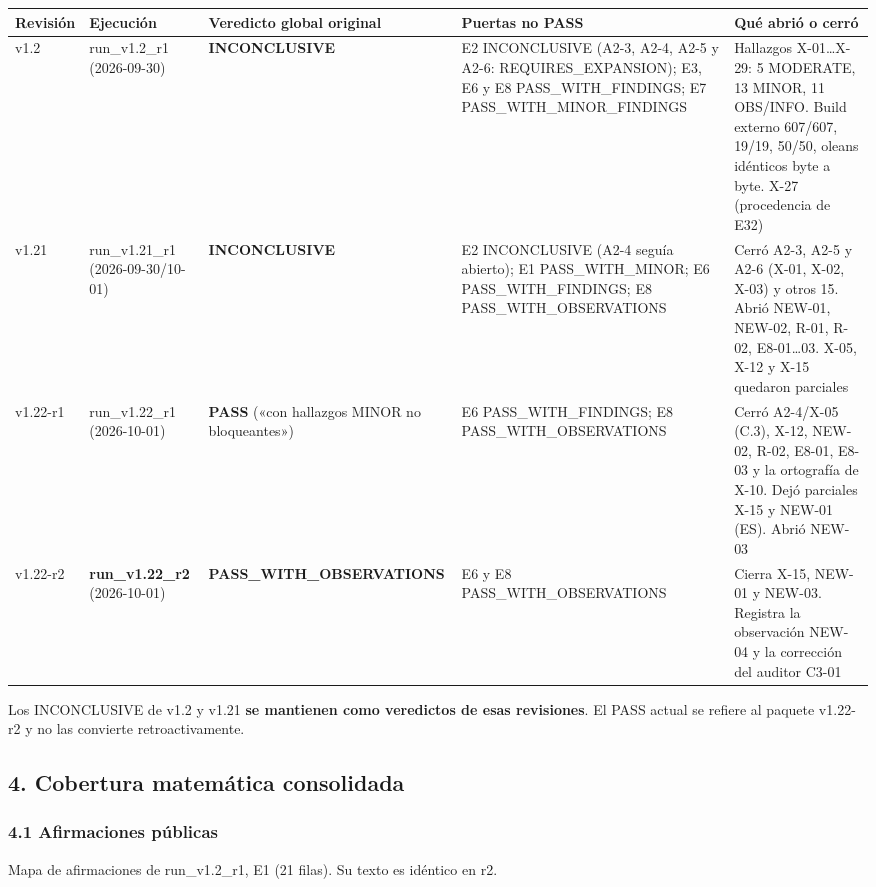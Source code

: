 \documentclass[
]{article}
\newcounter{none} %
\begin{document}
{\def\LTcaptype{none} %
\begin{longtable}[]{@{}lllll@{}}
\toprule\noalign{}
Revisión & Ejecución & Veredicto global original & Puertas no PASS & Qué
abrió o cerró \\
\midrule\noalign{}
\endhead
\bottomrule\noalign{}
\endlastfoot
v1.2 & run\_v1.2\_r1 (2026-09-30) & \textbf{INCONCLUSIVE} & E2
INCONCLUSIVE (A2-3, A2-4, A2-5 y A2-6: REQUIRES\_EXPANSION); E3, E6 y E8
PASS\_WITH\_FINDINGS; E7 PASS\_WITH\_MINOR\_FINDINGS & Hallazgos
X-01\ldots X-29: 5 MODERATE, 13 MINOR, 11 OBS/INFO. Build externo
607/607, 19/19, 50/50, oleans idénticos byte a byte. X-27 (procedencia
de E32) \\
v1.21 & run\_v1.21\_r1 (2026-09-30/10-01) & \textbf{INCONCLUSIVE} & E2
INCONCLUSIVE (A2-4 seguía abierto); E1 PASS\_WITH\_MINOR; E6
PASS\_WITH\_FINDINGS; E8 PASS\_WITH\_OBSERVATIONS & Cerró A2-3, A2-5 y
A2-6 (X-01, X-02, X-03) y otros 15. Abrió NEW-01, NEW-02, R-01, R-02,
E8-01\ldots03. X-05, X-12 y X-15 quedaron parciales \\
v1.22-r1 & run\_v1.22\_r1 (2026-10-01) & \textbf{PASS} («con hallazgos
MINOR no bloqueantes») & E6 PASS\_WITH\_FINDINGS; E8
PASS\_WITH\_OBSERVATIONS & Cerró A2-4/X-05 (C.3), X-12, NEW-02, R-02,
E8-01, E8-03 y la ortografía de X-10. Dejó parciales X-15 y NEW-01 (ES).
Abrió NEW-03 \\
v1.22-r2 & \textbf{run\_v1.22\_r2} (2026-10-01) &
\textbf{PASS\_WITH\_OBSERVATIONS} & E6 y E8 PASS\_WITH\_OBSERVATIONS &
Cierra X-15, NEW-01 y NEW-03. Registra la observación NEW-04 y la
corrección del auditor C3-01 \\
\end{longtable}
}

Los INCONCLUSIVE de v1.2 y v1.21 \textbf{se mantienen como veredictos de
esas revisiones}. El PASS actual se refiere al paquete v1.22-r2 y no las
convierte retroactivamente.

\subsection{4. Cobertura matemática
consolidada}\label{4-cobertura-matemuxe1tica-consolidada}

\subsubsection{4.1 Afirmaciones
públicas}\label{41-afirmaciones-puxfablicas}

Mapa de afirmaciones de run\_v1.2\_r1, E1 (21 filas). Su texto es
idéntico en r2.
\end{document}
